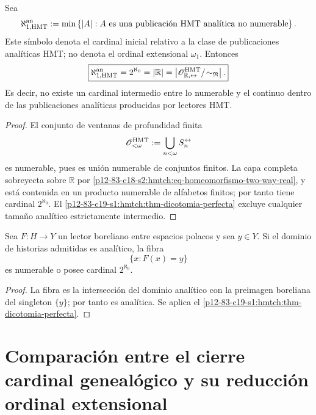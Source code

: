 \begin{corollary}
\label{p12-83-c19-s1:hmtch:cor-ch-analitica-hmt}
Sea
\begin{equation}
 \aleph_{1,\mathrm{HMT}}^{\rm an}
 :=\min\left\{|A|:
 A\text{ es una publicación HMT analítica no numerable}\right\}.
 \label{p12-83-c19-s1:hmtch:eq-aleph1-analitico-hmt}
\end{equation}
Este símbolo denota el cardinal inicial relativo a la clase de publicaciones
analíticas HMT; no denota el ordinal extensional \(\omega_1\).
Entonces
\begin{equation}
 \boxed{
 \aleph_{1,\mathrm{HMT}}^{\rm an}
 =2^{\aleph_0}
 =|\mathbb R|
 =\left|\mathscr O_{\mathbb R,\leftrightarrow}^{\rm HMT}/
 \!\sim_{\mathfrak R}\right|.}
 \label{p12-83-c19-s1:hmtch:eq-ch-analitica-hmt}
\end{equation}
Es decir, no existe un cardinal intermedio entre lo numerable y el continuo
dentro de las publicaciones analíticas producidas por lectores HMT.
\end{corollary}

\begin{proof}
El conjunto de ventanas de profundidad finita
\[
 \mathscr O_{<\omega}^{\rm HMT}
 :=\bigcup_{n<\omega}S_n^{\leftrightarrow}
\]
es numerable, pues es unión numerable de conjuntos finitos. La capa completa
sobreyecta sobre \(\mathbb R\) por
\eqref{p12-83-c18-s2:hmtch:eq-homeomorfismo-two-way-real}, y está contenida en un producto
numerable de alfabetos finitos; por tanto tiene cardinal
\(2^{\aleph_0}\). El
\cref{p12-83-c19-s1:hmtch:thm-dicotomia-perfecta} excluye cualquier tamaño analítico
estrictamente intermedio.
\end{proof}

\begin{corollary}
\label{p12-83-c19-s1:hmtch:cor-dicotomia-fibras}
Sea \(F:H\to Y\) un lector boreliano entre espacios polacos y sea
\(y\in Y\). Si el dominio de historias admitidas es analítico, la fibra
\[
 \{x:F(x)=y\}
\]
es numerable o posee cardinal \(2^{\aleph_0}\).
\end{corollary}

\begin{proof}
La fibra es la intersección del dominio analítico con la preimagen
boreliana del singleton \(\{y\}\); por tanto es analítica. Se aplica el
\cref{p12-83-c19-s1:hmtch:thm-dicotomia-perfecta}.
\end{proof}

\section{Comparación entre el cierre cardinal genealógico y su reducción ordinal extensional}

